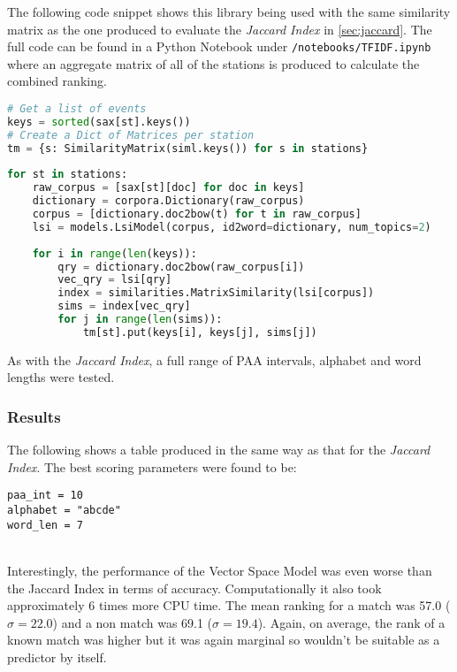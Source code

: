 \documentclass[../report.tex]{subfiles}
\begin{document}
	The following code snippet shows this library being used with the same similarity matrix as the one produced to evaluate the \textit{Jaccard Index} in \cref{sec:jaccard}.  The full code can be found in a Python Notebook under \verb|/notebooks/TFIDF.ipynb| where an aggregate matrix of all of the stations is produced to calculate the combined ranking.  
	
\begin{lstlisting}[language=Python]
# Get a list of events
keys = sorted(sax[st].keys())
# Create a Dict of Matrices per station
tm = {s: SimilarityMatrix(siml.keys()) for s in stations}
	
for st in stations:
	raw_corpus = [sax[st][doc] for doc in keys]
	dictionary = corpora.Dictionary(raw_corpus)
	corpus = [dictionary.doc2bow(t) for t in raw_corpus]
	lsi = models.LsiModel(corpus, id2word=dictionary, num_topics=2)
	
	for i in range(len(keys)):
		qry = dictionary.doc2bow(raw_corpus[i])
		vec_qry = lsi[qry]
		index = similarities.MatrixSimilarity(lsi[corpus])
		sims = index[vec_qry]
		for j in range(len(sims)):
			tm[st].put(keys[i], keys[j], sims[j])
\end{lstlisting}
	
	As with the \textit{Jaccard Index}, a full range of PAA intervals, alphabet and word lengths were tested.

	
\subsubsection{Results}

	The following shows a table produced in the same way as that for the \textit{Jaccard Index}.  The best scoring parameters were found to be:
\begin{verbatim}
paa_int = 10
alphabet = "abcde"
word_len = 7
\end{verbatim}
	
\\

	Interestingly, the performance of the Vector Space Model was even worse than the Jaccard Index in terms of accuracy.  Computationally it also took approximately 6 times more CPU time.  The mean ranking for a match was 57.0 ($\sigma = 22.0$) and a non match was 69.1 ($\sigma = 19.4$).  Again, on average, the rank of a known match was higher but it was again marginal so wouldn't be suitable as a predictor by itself.
	
\end{document}
